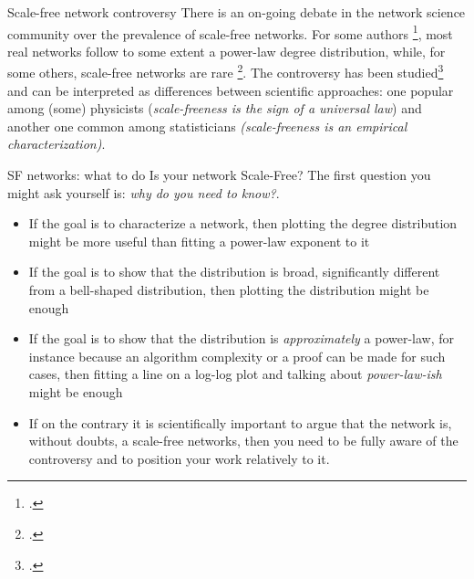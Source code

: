 \documentclass[a4paper,11pt]{book}
\begin{document}
\begin{textbox}{Scale-free network controversy}
There is an on-going debate in the network science community over the prevalence of scale-free networks. For some authors \footcite{barabasi2003scale}, most real networks follow to some extent a power-law degree distribution, while, for some others, scale-free networks are rare \footcite{broido2019scale}. The controversy has been studied\footcite{jacomy2020epistemic} and can be interpreted as differences between scientific approaches: one popular among (some) physicists (\textit{scale-freeness is the sign of a universal law}) and another one common among statisticians \textit{(scale-freeness is an empirical characterization)}.
\end{textbox}

\begin{textbox}{SF networks: what to do}
Is your network Scale-Free? The first question you might ask yourself is: \textit{why do you need to know?}. 
\begin{itemize}
    \item If the goal is to characterize a network, then plotting the degree distribution might be more useful than fitting a power-law exponent to it
 \item If the goal is to show that the distribution is broad, significantly different from a bell-shaped distribution, then plotting the distribution might be enough
 \item If the goal is to show that the distribution is \textit{approximately} a power-law, for instance because an algorithm complexity or a proof can be made for such cases, then fitting a line on a log-log plot and talking about \textit{power-law-ish} might be enough
 \item If on the contrary it is scientifically important to argue that the network is, without doubts, a scale-free networks, then you need to be fully aware of the controversy and to position your work relatively to it.  
\end{itemize}
\end{textbox}





\end{document}
